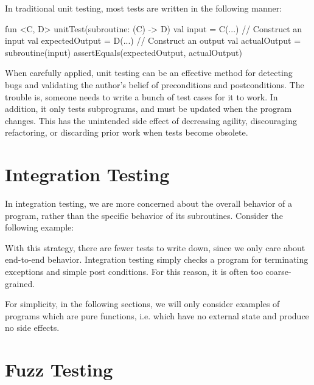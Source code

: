 \documentclass[12pt,initial,twoside,maitrise]{dms}
\numberwithin{equation}{section}
\numberwithin{table}{chapter}
\numberwithin{figure}{chapter}
\begin{document}
\noindent In traditional unit testing, most tests are written in the following manner:
%
\begin{kotlinlisting}
fun <C, D> unitTest(subroutine: (C) -> D) {
    val input = C(...) // Construct an input
    val expectedOutput = D(...) // Construct an output
    val actualOutput = subroutine(input)
    assertEquals(expectedOutput, actualOutput)
}
\end{kotlinlisting}
%
When carefully applied, unit testing can be an effective method for detecting bugs and validating the author's belief of preconditions and postconditions. The trouble is, someone needs to write a bunch of test cases for it to work. In addition, it only tests subprograms, and must be updated when the program changes. This has the unintended side effect of decreasing agility, discouraging refactoring, or discarding prior work when tests become obsolete.

\section{Integration Testing}

\noindent In integration testing, we are more concerned about the overall behavior of a program, rather than the specific behavior of its subroutines. Consider the following example:

%
With this strategy, there are fewer tests to write down, since we only care about end-to-end behavior. Integration testing simply checks a program for terminating exceptions and simple post conditions. For this reason, it is often too coarse-grained.

For simplicity, in the following sections, we will only consider examples of programs which are pure functions, i.e. which have no external state and produce no side effects.

\section{Fuzz Testing}
\end{document}
